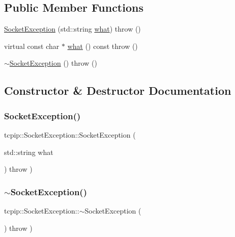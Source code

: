 \subsection*{Public Member Functions}
\begin{DoxyCompactItemize}
\item 
\hyperlink{classtcpip_1_1_socket_exception_a0a7e5fe0b6e39de21a90cc81ed69668a}{Socket\+Exception} (std\+::string \hyperlink{classtcpip_1_1_socket_exception_a37ca5e1050f6a8e1ee97f400945405cb}{what})  throw ()
\item 
virtual const char $\ast$ \hyperlink{classtcpip_1_1_socket_exception_a37ca5e1050f6a8e1ee97f400945405cb}{what} () const  throw ()
\item 
\hyperlink{classtcpip_1_1_socket_exception_a6c7058a26eeb13157f63ad4b46af4a68}{$\sim$\+Socket\+Exception} ()  throw ()
\end{DoxyCompactItemize}


\subsection{Constructor \& Destructor Documentation}
\mbox{\label{classtcpip_1_1_socket_exception_a0a7e5fe0b6e39de21a90cc81ed69668a}} 
\subsubsection{\texorpdfstring{Socket\+Exception()}{SocketException()}}
{\footnotesize\ttfamily tcpip\+::\+Socket\+Exception\+::\+Socket\+Exception (\begin{DoxyParamCaption}\item[{std\+::string}]{what }\end{DoxyParamCaption}) throw  ) \hspace{0.3cm}{\ttfamily [inline]}}

\mbox{\label{classtcpip_1_1_socket_exception_a6c7058a26eeb13157f63ad4b46af4a68}} 
\subsubsection{\texorpdfstring{$\sim$\+Socket\+Exception()}{~SocketException()}}
{\footnotesize\ttfamily tcpip\+::\+Socket\+Exception\+::$\sim$\+Socket\+Exception (\begin{DoxyParamCaption}{ }\end{DoxyParamCaption}) throw  ) \hspace{0.3cm}{\ttfamily [inline]}}



